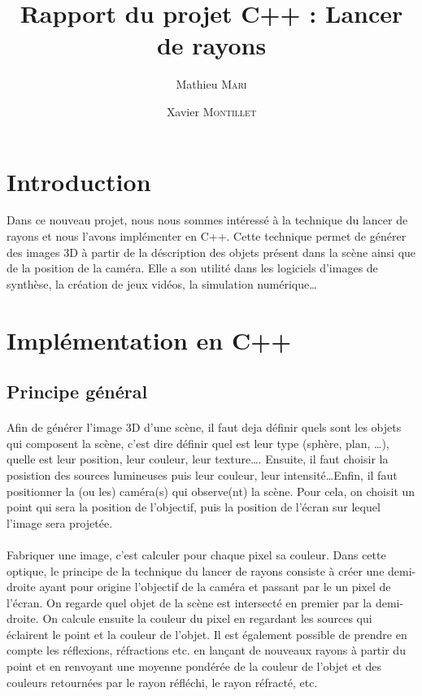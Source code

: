 \documentclass{article}
\title{Rapport du projet C++ : Lancer de rayons}
\author{Mathieu \textsc{Mari} \and Xavier \textsc{Montillet}}
\begin{document}
\maketitle
\tableofcontents
	

\section{Introduction}
Dans ce nouveau projet, nous nous sommes intéressé à la technique du lancer de rayons et nous l'avons implémenter en C++.
Cette technique permet de générer des images 3D à partir de la déscription des objets présent dans la scène ainsi que de la position de la caméra. Elle a son utilité dans les logiciels d'images de synthèse, la création de jeux vidéos, la simulation numérique\dots  	

\section{Implémentation en C++}
	\subsection{Principe général}
	\paragraph{}		
Afin de générer l'image 3D d'une scène, il faut deja définir quels sont les objets qui composent la scène, c'est dire définir quel est leur type (sphère, plan, \dots), quelle est leur position, leur couleur, leur texture\dots. Ensuite, il faut choisir la posistion des sources lumineuses puis leur couleur, leur intensité\dots Enfin, il faut positionner la (ou les) caméra(s) qui observe(nt) la scène. Pour cela, on choisit un point qui sera la position de l'objectif, puis la position de l'écran sur lequel l'image sera projetée.

	\paragraph{}
		Fabriquer une image, c'est calculer pour chaque pixel sa couleur. Dans cette optique, le principe de la technique du lancer de rayons consiste à créer une demi-droite ayant pour origine l'objectif de la caméra et passant par le un pixel de l'écran. On regarde quel objet de la scène est intersecté en premier par la demi-droite. On calcule ensuite la couleur du pixel en regardant les sources qui éclairent le point et la couleur de l'objet. Il est également possible de prendre en compte les réflexions, réfractions etc. en lançant de nouveaux rayons \`a partir du point et en renvoyant une moyenne pondérée de la couleur de l'objet et des couleurs retournées par le rayon réfléchi, le rayon réfracté, etc.
\end{document}
